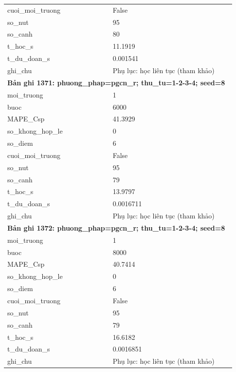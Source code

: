 \begin{longtable}{p{0.43\linewidth}p{0.50\linewidth}}
cuoi\_\allowbreak moi\_\allowbreak truong & False \\
so\_\allowbreak nut & 95 \\
so\_\allowbreak canh & 80 \\
t\_\allowbreak hoc\_\allowbreak s & 11.1919 \\
t\_\allowbreak du\_\allowbreak doan\_\allowbreak s & 0.001541 \\
ghi\_\allowbreak chu & Phụ lục: học liên tục (tham khảo) \\
\midrule
\multicolumn{2}{p{0.95\linewidth}}{\textbf{Bản ghi 1371: phuong\_phap=pgcn\_r; thu\_tu=1-2-3-4; seed=8}} \\
moi\_\allowbreak truong & 1 \\
buoc & 6000 \\
MAPE\_\allowbreak Csp & 41.3929 \\
so\_\allowbreak khong\_\allowbreak hop\_\allowbreak le & 0 \\
so\_\allowbreak diem & 6 \\
cuoi\_\allowbreak moi\_\allowbreak truong & False \\
so\_\allowbreak nut & 95 \\
so\_\allowbreak canh & 79 \\
t\_\allowbreak hoc\_\allowbreak s & 13.9797 \\
t\_\allowbreak du\_\allowbreak doan\_\allowbreak s & 0.0016711 \\
ghi\_\allowbreak chu & Phụ lục: học liên tục (tham khảo) \\
\midrule
\multicolumn{2}{p{0.95\linewidth}}{\textbf{Bản ghi 1372: phuong\_phap=pgcn\_r; thu\_tu=1-2-3-4; seed=8}} \\
moi\_\allowbreak truong & 1 \\
buoc & 8000 \\
MAPE\_\allowbreak Csp & 40.7414 \\
so\_\allowbreak khong\_\allowbreak hop\_\allowbreak le & 0 \\
so\_\allowbreak diem & 6 \\
cuoi\_\allowbreak moi\_\allowbreak truong & False \\
so\_\allowbreak nut & 95 \\
so\_\allowbreak canh & 79 \\
t\_\allowbreak hoc\_\allowbreak s & 16.6182 \\
t\_\allowbreak du\_\allowbreak doan\_\allowbreak s & 0.0016851 \\
ghi\_\allowbreak chu & Phụ lục: học liên tục (tham khảo) \\

\end{longtable}
